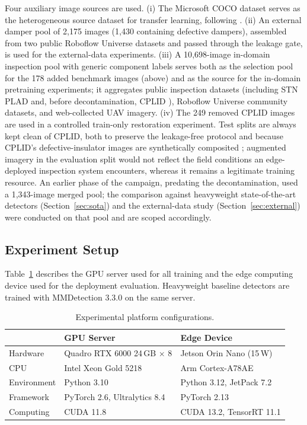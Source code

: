 \documentclass[conference]{IEEEtran}
\begin{document}
Four auxiliary image sources are used. (i) The Microsoft COCO dataset \cite{lin2014coco} serves as the heterogeneous source dataset for transfer learning, following \cite{tsai2025atli,vazquez2024wildfire}. (ii) An external damper pool of 2{,}175 images (1{,}430 containing defective dampers), assembled from two public Roboflow Universe datasets \cite{wangbo2025damper,yolov11tasks2025damper} and passed through the leakage gate, is used for the external-data experiments. (iii) A 10{,}698-image in-domain inspection pool with generic component labels serves both as the selection pool for the 178 added benchmark images (above) and as the source for the in-domain pretraining experiments; it aggregates public inspection datasets (including STN PLAD \cite{vieiraesilva2021stnplad} and, before decontamination, CPLID \cite{tao2020insulator}), Roboflow Universe community datasets, and web-collected UAV imagery. (iv) The 249 removed CPLID images are used in a controlled train-only restoration experiment. Test splits are always kept clean of CPLID, both to preserve the leakage-free protocol and because CPLID's defective-insulator images are synthetically composited \cite{tao2020insulator}; augmented imagery in the evaluation split would not reflect the field conditions an edge-deployed inspection system encounters, whereas it remains a legitimate training resource. An earlier phase of the campaign, predating the decontamination, used a 1{,}343-image merged pool; the comparison against heavyweight state-of-the-art detectors (Section~\ref{sec:sota}) and the external-data study (Section~\ref{sec:external}) were conducted on that pool and are scoped accordingly.

\subsection{Experiment Setup}
Table~\ref{tab:platforms} describes the GPU server used for all training and the edge computing device used for the deployment evaluation. Heavyweight baseline detectors are trained with MMDetection 3.3.0 \cite{chen2019mmdetection} on the same server.

\begin{table}[t]
\caption{Experimental platform configurations.}
\label{tab:platforms}
\centering
\footnotesize
\setlength{\tabcolsep}{4pt}
\begin{tabular}{lll}
\toprule
 & GPU Server & Edge Device \\
\midrule
Hardware & Quadro RTX 6000 24\,GB $\times$ 8 & Jetson Orin Nano (15\,W) \\
CPU & Intel Xeon Gold 5218 & Arm Cortex-A78AE \\
Environment & Python 3.10 & Python 3.12, JetPack 7.2 \\
Framework & PyTorch 2.6, Ultralytics 8.4 \cite{jocher2023ultralytics} & PyTorch 2.13 \\
Computing & CUDA 11.8 & CUDA 13.2, TensorRT 11.1 \\
\bottomrule
\end{tabular}
\end{table}
\end{document}
